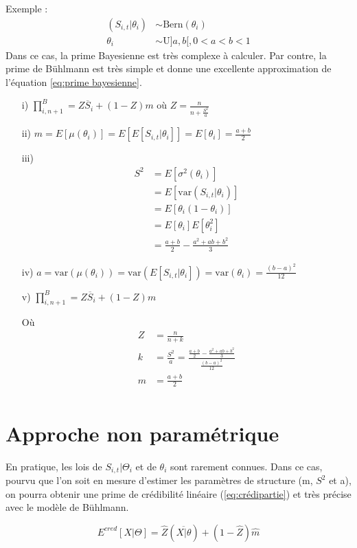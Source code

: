 \documentclass[11pt,french]{report}
\begin{document}
Exemple : 
\begin{align*}
(S_{i,t}|\theta_i) & \sim \text{Bern}(\theta_i) \\
\theta_i & \sim \text{U} ]a,b[, 0 < a<b<1
\end{align*}
Dans ce cas, la prime Bayesienne est très complexe à calculer.
Par contre, la prime de Bühlmann est très simple et donne une excellente approximation de l'équation \ref{eq:prime bayesienne}.
\begin{itemize}
\item[i)] $\prod_{i,n+1}^{B} = Z \overline{S}_i + (1 -Z)m$ où $Z = \frac{n}{n + \frac{S^2}{a}}$
\item[ii)] $m = E[\mu(\theta_i)] = E[E[S_{i,t}|\theta_i]] = E[\theta_i] = \frac{a+b}{2}$
\item[iii)] \begin{align*}
S^2 &= E[\sigma^2(\theta_i)] \\
&= E[\text{var}(S_{i,t}|\theta_i)] \\
&= E[\theta_i(1 - \theta_i)] \\
&= E[\theta_i]E[\theta_{i}^{2}] \\
&= \frac{a+b}{2} - \frac{a^2 + ab + b^2}{3}
\end{align*}
\item[iv)] $a =\text{var}(\mu(\theta_i)) = \text{var}(E[S_{i,t}|\theta_i]) = \text{var}(\theta_i) = \frac{(b - a)^2}{12}$
\item[v)] $ \prod_{i,n+1}^{B} = Z \overline{S}_i + (1 -Z)m$

Où 
\begin{align*}
Z &=  \frac{n}{n+k} \\
k &= \frac{S^2}{a} = \frac{\frac{a+b}{2} - \frac{a^2 + ab + b^2}{3}}{\frac{(b - a)^2}{12}} \\
m &= \frac{a + b}{2}\\
\end{align*}
\end{itemize}

\section{Approche non paramétrique}
En pratique, les lois de $S_{i,t}|\Theta_i$ et de $\theta_i$ sont rarement connues. Dans ce cas, pourvu que l'on soit en mesure d'estimer les paramètres de structure (m, $S^2$ et a), on pourra obtenir une prime de crédibilité linéaire (\ref{eq:crédipartie}) et très précise avec le modèle de Bühlmann.

\begin{equation}
E^{cred}[X|\Theta] = \widehat{Z} (\overline{X|\theta}) + (1 - \widehat{Z}) \widehat{m}
\end{equation}
\end{document}
